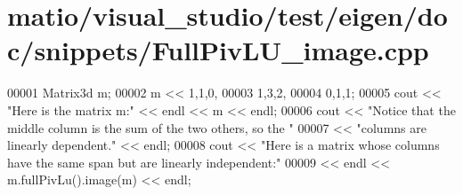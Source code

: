 \hypertarget{matio_2visual__studio_2test_2eigen_2doc_2snippets_2_full_piv_l_u__image_8cpp_source}{}\section{matio/visual\+\_\+studio/test/eigen/doc/snippets/\+Full\+Piv\+L\+U\+\_\+image.cpp}
\label{matio_2visual__studio_2test_2eigen_2doc_2snippets_2_full_piv_l_u__image_8cpp_source}

\begin{DoxyCode}
00001 Matrix3d m;
00002 m << 1,1,0,
00003      1,3,2,
00004      0,1,1;
00005 cout << \textcolor{stringliteral}{"Here is the matrix m:"} << endl << m << endl;
00006 cout << \textcolor{stringliteral}{"Notice that the middle column is the sum of the two others, so the "}
00007      << \textcolor{stringliteral}{"columns are linearly dependent."} << endl;
00008 cout << \textcolor{stringliteral}{"Here is a matrix whose columns have the same span but are linearly independent:"}
00009      << endl << m.fullPivLu().image(m) << endl;
\end{DoxyCode}
